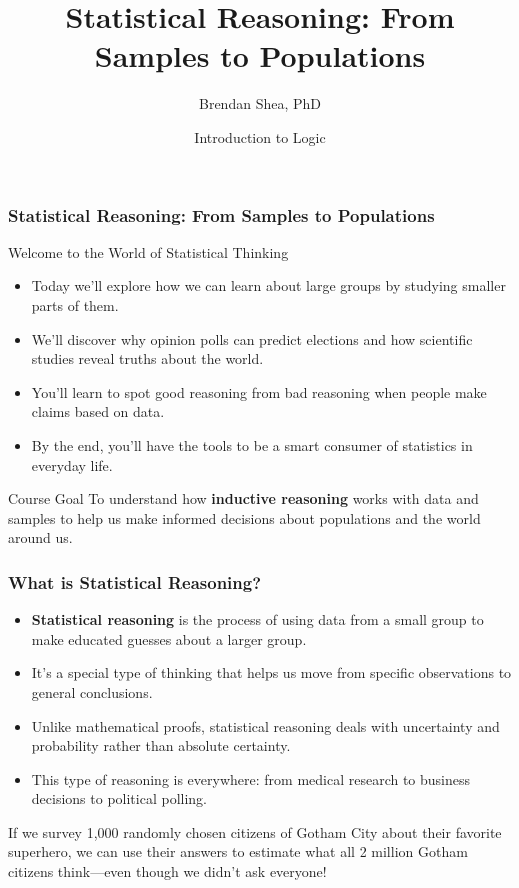 \documentclass{beamer}
\title{Statistical Reasoning: From Samples to Populations}
\author{Brendan Shea, PhD}
\date{Introduction to Logic}
\begin{document}
	
	\frame{\titlepage}
	
	\begin{frame}
		\frametitle{Statistical Reasoning: From Samples to Populations}
		\begin{center}
			{\Large Welcome to the World of Statistical Thinking}
		\end{center}
		
		\begin{itemize}
			\item Today we'll explore how we can learn about large groups by studying smaller parts of them.
			\item We'll discover why opinion polls can predict elections and how scientific studies reveal truths about the world.
			\item You'll learn to spot good reasoning from bad reasoning when people make claims based on data.
			\item By the end, you'll have the tools to be a smart consumer of statistics in everyday life.
		\end{itemize}
		
		\begin{block}{Course Goal}
			To understand how \textbf{inductive reasoning} works with data and samples to help us make informed decisions about populations and the world around us.
		\end{block}
		
	\end{frame}
	
	\begin{frame}
		\frametitle{What is Statistical Reasoning?}
		
		\begin{itemize}
			\item \textbf{Statistical reasoning} is the process of using data from a small group to make educated guesses about a larger group.
			\item It's a special type of thinking that helps us move from specific observations to general conclusions.
			\item Unlike mathematical proofs, statistical reasoning deals with uncertainty and probability rather than absolute certainty.
			\item This type of reasoning is everywhere: from medical research to business decisions to political polling.
		\end{itemize}
		
		\begin{example}
			If we survey 1,000 randomly chosen citizens of Gotham City about their favorite superhero, we can use their answers to estimate what all 2 million Gotham citizens think—even though we didn't ask everyone!
		\end{example}
		
	\end{frame}
	
\end{document}

